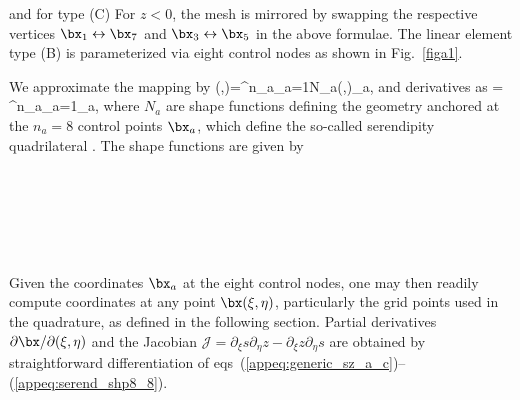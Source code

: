 %
\eq \label{appeq:sz_bot_a}
\en
%
and for type (C)
\eq \label{appeq:sz_bot_c}
\en
%
For $z<0$, the mesh is mirrored by swapping the respective vertices
$\bx_1 \leftrightarrow \bx_7$ and $\bx_3 \leftrightarrow \bx_5$
in the above formulae.
The linear element type (B) is parameterized via eight control nodes as shown
in Fig.~\ref{figa1}.

We approximate the mapping by \cite[e.g.][]{KoTr99}
%
\eq
\bx(\xi,\eta)=\sum^{n_a}_{a=1}N_a(\xi,\eta)\bx_a,\; \textrm{and derivatives as}
\;\;\;=
\sum^{n_a}_{a=1}\bx_a,
\en
where $N_a$ are shape functions defining the geometry anchored at the $n_a=8$
control points $\bx_a$, which define the so-called serendipity quadrilateral
\citep{hughes}. The shape functions are given by
%
\eqa
{}
\label{appeq:serend_shp8_1}\\
\\
\\
\\
\\
\\
\\
\label{appeq:serend_shp8_8}
\ena
%
Given the coordinates $\bx_a$ at the eight control nodes, one may then readily
compute coordinates at any point $\bx(\xi,\eta)$,
particularly the grid points used in the quadrature,
as defined in the following section.
%
Partial derivatives $\partial\bx/\partial(\xi,\eta)$ and the Jacobian
${\mathcal J}=\partial_\xi{s}\partial_\eta{z}-\partial_\xi{z}\partial_\eta{s}$
are obtained by straightforward differentiation of
eqs~(\ref{appeq:generic_sz_a_c})--(\ref{appeq:serend_shp8_8}).
%
%

